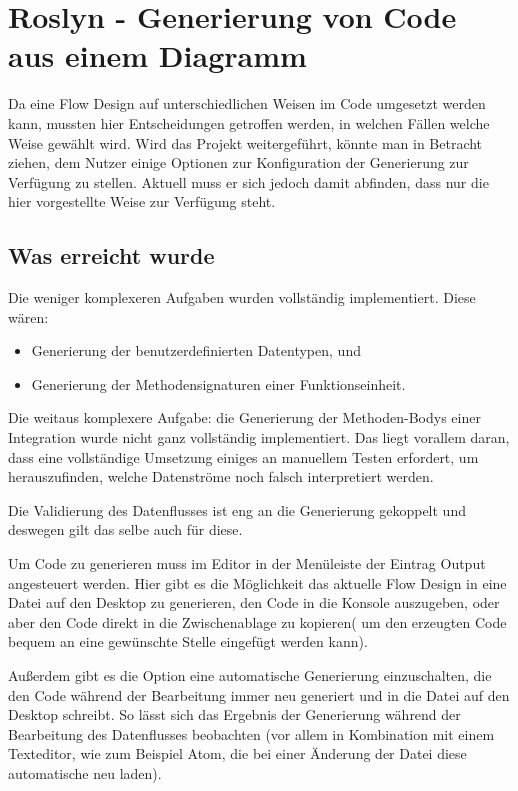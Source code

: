 \section{Roslyn - Generierung von Code aus einem Diagramm}

Da eine Flow Design auf unterschiedlichen Weisen im Code umgesetzt werden
kann, mussten hier Entscheidungen getroffen werden, in welchen Fällen
welche Weise gewählt wird. Wird das Projekt weitergeführt, könnte man in
Betracht ziehen, dem Nutzer einige Optionen zur Konfiguration der Generierung
zur Verfügung zu stellen. Aktuell muss er sich jedoch damit abfinden, dass nur die hier vorgestellte Weise zur Verfügung steht.


\subsection{Was erreicht wurde}

Die weniger komplexeren Aufgaben wurden vollständig implementiert.
Diese wären: 
\begin{itemize}
	\item Generierung der benutzerdefinierten Datentypen, und 
	\item Generierung der Methodensignaturen einer Funktionseinheit.
\end{itemize}

Die weitaus komplexere Aufgabe: die Generierung der Methoden-Bodys einer Integration wurde nicht ganz vollständig implementiert.
Das liegt vorallem daran, dass eine vollständige Umsetzung einiges an manuellem Testen erfordert, um herauszufinden, welche Datenströme noch falsch interpretiert werden. 

Die Validierung des Datenflusses ist eng an die Generierung gekoppelt und deswegen gilt das selbe auch für diese. 

Um Code zu generieren muss im Editor in der Menüleiste der Eintrag Output angesteuert werden.
Hier gibt es die Möglichkeit das aktuelle Flow Design in eine Datei auf den Desktop zu
generieren, den Code in die Konsole auszugeben, oder aber den Code direkt in die Zwischenablage zu kopieren( um den erzeugten Code bequem an eine gewünschte Stelle eingefügt werden kann).

Außerdem gibt es die Option eine automatische Generierung einzuschalten, die
den Code während der Bearbeitung immer neu generiert und in die Datei
auf den Desktop schreibt. So lässt sich das Ergebnis der Generierung während der Bearbeitung
des Datenflusses beobachten (vor allem in Kombination mit einem
Texteditor, wie zum Beispiel Atom, die bei einer Änderung der Datei diese automatische neu laden).

